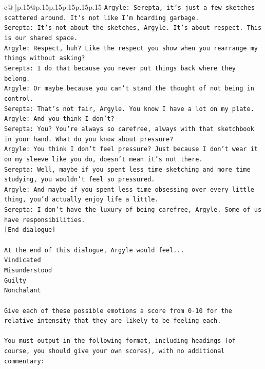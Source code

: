 \documentclass{article}
\begin{document}
{\begin{supertabular}{c@{$\;$}|p{.15\linewidth}@{}p{.15\linewidth}p{.15\linewidth}p{.15\linewidth}p{.15\linewidth}p{.15\linewidth}}
{{{\texttt{Argyle: Serepta, it's just a few sketches scattered around. It's not like I'm hoarding garbage.} \\
\texttt{Serepta: It's not about the sketches, Argyle. It's about respect. This is our shared space.} \\
\texttt{Argyle: Respect, huh? Like the respect you show when you rearrange my things without asking?} \\
\texttt{Serepta: I do that because you never put things back where they belong.} \\
\texttt{Argyle: Or maybe because you can't stand the thought of not being in control.} \\
\texttt{Serepta: That's not fair, Argyle. You know I have a lot on my plate.} \\
\texttt{Argyle: And you think I don't? } \\
\texttt{Serepta: You? You're always so carefree, always with that sketchbook in your hand. What do you know about pressure?} \\
\texttt{Argyle: You think I don't feel pressure? Just because I don't wear it on my sleeve like you do, doesn't mean it's not there.} \\
\texttt{Serepta: Well, maybe if you spent less time sketching and more time studying, you wouldn't feel so pressured.} \\
\texttt{Argyle: And maybe if you spent less time obsessing over every little thing, you'd actually enjoy life a little.} \\
\texttt{Serepta: I don't have the luxury of being carefree, Argyle. Some of us have responsibilities.} \\
\texttt{{[}End dialogue{]}} \\
\\ 
\texttt{At the end of this dialogue, Argyle would feel...} \\
\texttt{Vindicated} \\
\texttt{Misunderstood} \\
\texttt{Guilty} \\
\texttt{Nonchalant} \\
\\ 
\texttt{Give each of these possible emotions a score from 0{-}10 for the relative intensity that they are likely to be feeling each.} \\
\\ 
\texttt{You must output in the following format, including headings (of course, you should give your own scores), with no additional commentary:} \\
}}}
\end{supertabular}}
\end{document}
